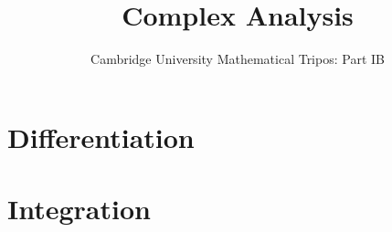 \documentclass{article}
\title{Complex Analysis}
\author{Cambridge University Mathematical Tripos: Part IB}
\begin{document}
\maketitle

\tableofcontentsnewpage{}

\section{Differentiation}

\section{Integration}

\end{document}
